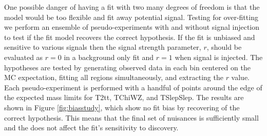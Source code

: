 One possible danger of having a fit with two many degrees of freedom is that the model would be too flexible and fit away potential signal. Testing for over-fitting we perform an ensemble of pseudo-experiments with and without signal injection to test if the fit model recovers the correct hypothesis.  If the fit is unbiased and sensitive to various signals then the signal strength parameter, $r$, should be evaluated as $r=0$ in a background only fit and $r=1$ when signal is injected.  The hypotheses are tested by generating observed data in each bin centered on the MC expectation, fitting all regions simultaneously, and extracting the $r$ value. Each pseudo-experiment is performed with a handful of points around the edge of the expected mass limits for T2tt, TChiWZ, and TSlepSlep. The results are shown in Figure \ref{fig:biasstudy}, which show no fit bias by recovering of the correct hypothesis. This means that the final set of nuisances is sufficiently small and the does not affect the fit's sensitivity to discovery.

 


